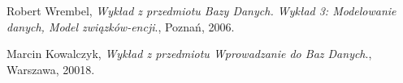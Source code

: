 \documentclass{mwrep}[15pt]
\begin{document}
\begin{thebibliography}{9}

	

	  Robert Wrembel,
	  \emph{Wykład z przedmiotu Bazy Danych. Wykład 3: Modelowanie danych, Model związków-encji}.,
	  Poznań,
	  2006.

	
	  Marcin Kowalczyk,
	  \emph{Wykład z przedmiotu Wprowadzanie do Baz Danych}.,
	  Warszawa,
	  20018.
	
	\end{thebibliography}
\end{document}
